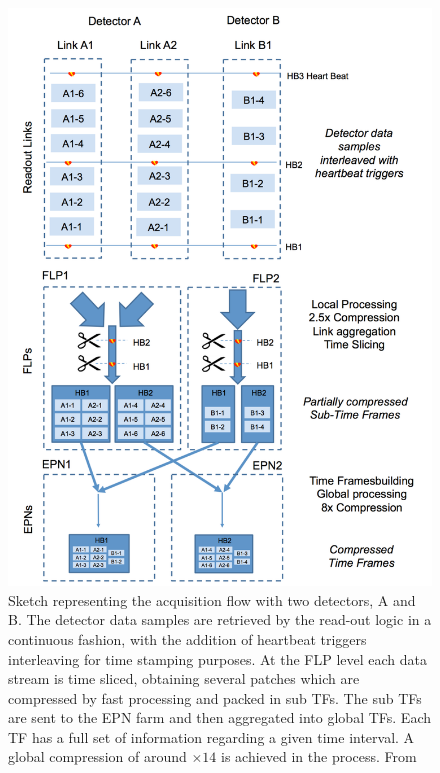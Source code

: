 \begin{figure}[!]
\begin{center}
\includegraphics[width=0.9\linewidth]{Chapters/O2/Figs/TF.pdf}
\caption{Sketch representing the acquisition flow with two detectors, A and B. The detector data samples are retrieved by the read-out logic in a continuous fashion, with the addition of heartbeat triggers interleaving for time stamping purposes. At the FLP level each data stream is time sliced, obtaining several patches which are compressed by fast processing and packed in sub TFs. The sub TFs are sent to the EPN farm and then aggregated into global TFs. Each TF has a full set of information regarding a given time interval. A global compression of around $\times14$ is achieved in the process. From \cite{Buncic:2011297}}
\label{fig:O2_TF}
\end{center}
\end{figure}

